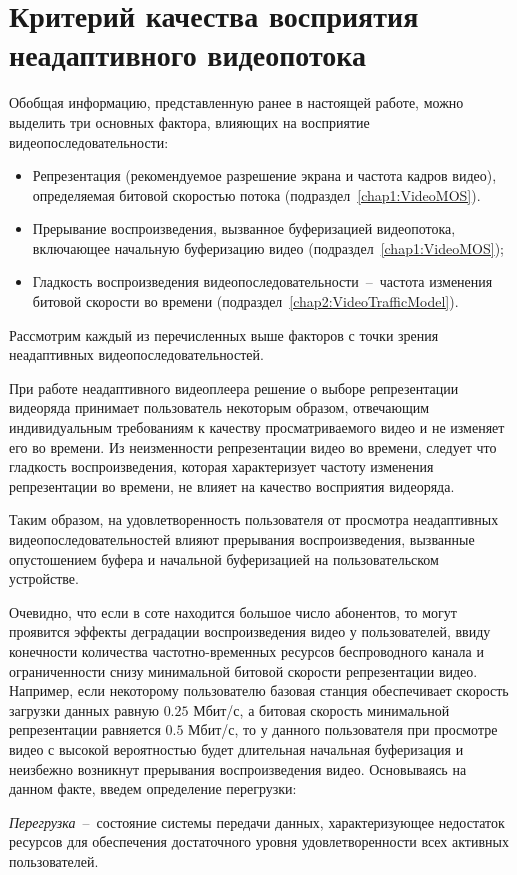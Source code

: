 \section{Критерий качества восприятия неадаптивного видеопотока}
\label{chap3:NonAdaptiveQoe}
Обобщая информацию, представленную ранее в настоящей работе, можно выделить три основных фактора, влияющих на восприятие видеопоследовательности:
\begin{itemize}
	\item Репрезентация (рекомендуемое разрешение экрана и частота кадров видео), определяемая битовой скоростью потока (подраздел~\ref{chap1:VideoMOS}).
	\item Прерывание воспроизведения, вызванное буферизацией видеопотока, включающее начальную буферизацию видео (подраздел~\ref{chap1:VideoMOS});
	\item Гладкость воспроизведения видеопоследовательности~--~частота изменения битовой скорости во времени (подраздел~\ref{chap2:VideoTrafficModel}).
\end{itemize}
Рассмотрим каждый из перечисленных выше факторов с точки зрения неадаптивных видеопоследовательностей.

При работе неадаптивного видеоплеера решение о выборе репрезентации видеоряда принимает пользователь некоторым образом, отвечающим индивидуальным требованиям к качеству просматриваемого видео и не изменяет его во времени. Из неизменности репрезентации видео во времени, следует что гладкость воспроизведения, которая характеризует частоту изменения репрезентации во времени, не влияет на качество восприятия видеоряда.

Таким образом, на удовлетворенность пользователя от просмотра неадаптивных видеопоследовательностей влияют прерывания воспроизведения, вызванные опустошением буфера и начальной буферизацией на пользовательском устройстве.

Очевидно, что если в соте находится большое число абонентов, то могут проявится эффекты деградации воспроизведения видео у пользователей, ввиду конечности количества частотно-временных ресурсов беспроводного канала и ограниченности снизу минимальной битовой скорости репрезентации видео. Например, если некоторому пользователю базовая станция обеспечивает скорость загрузки данных равную $0.25$ Мбит/с, а битовая скорость минимальной репрезентации равняется $0.5$ Мбит/с, то у данного пользователя при просмотре видео с высокой вероятностью будет длительная начальная буферизация и неизбежно возникнут прерывания воспроизведения видео. Основываясь на данном факте, введем определение перегрузки:
\begin{definition}
\label{def:Congestion}
    \emph{Перегрузка}~--~состояние системы передачи данных, характеризующее недостаток ресурсов для обеспечения достаточного уровня удовлетворенности всех активных пользователей.
\end{definition}

